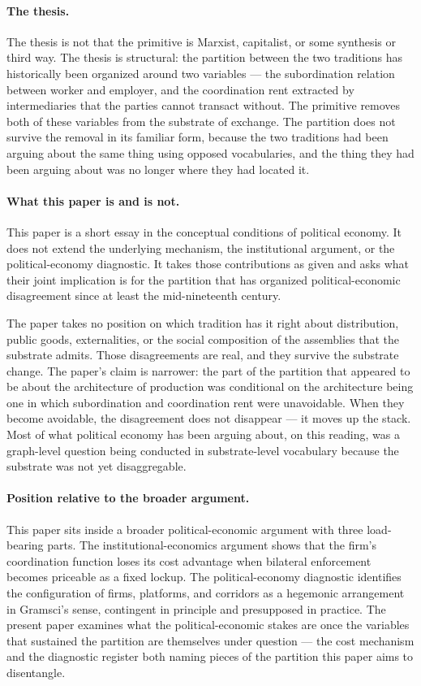 \documentclass[11pt,a4paper]{article}
\theoremstyle{remark}
\begin{document}
\paragraph{The thesis.}
The thesis is not that the primitive is Marxist, capitalist, or
some synthesis or third way. The thesis is structural: the
partition between the two traditions has historically been
organized around two variables --- the subordination relation
between worker and employer, and the coordination rent extracted by
intermediaries that the parties cannot transact without. The
primitive removes both of these variables from the substrate of
exchange. The partition does not survive the removal in its
familiar form, because the two traditions had been arguing about
the same thing using opposed vocabularies, and the thing they had
been arguing about was no longer where they had located it.

\paragraph{What this paper is and is not.}
This paper is a short essay in the conceptual conditions of
political economy. It does not extend the underlying mechanism,
the institutional argument, or the political-economy diagnostic.
It takes those contributions as given and asks what their joint
implication is for the partition that has organized
political-economic disagreement since at least the
mid-nineteenth century.

The paper takes no position on which tradition has it right about
distribution, public goods, externalities, or the social
composition of the assemblies that the substrate admits. Those
disagreements are real, and they survive the substrate change.
The paper's claim is narrower: the part of the partition that
appeared to be about the architecture of production was
conditional on the architecture being one in which subordination
and coordination rent were unavoidable. When they become
avoidable, the disagreement does not disappear --- it moves up the
stack. Most of what political economy has been arguing about, on
this reading, was a graph-level question being conducted in
substrate-level vocabulary because the substrate was not yet
disaggregable.

\paragraph{Position relative to the broader argument.}
This paper sits inside a broader political-economic argument
with three load-bearing parts. The institutional-economics
argument shows that the firm's coordination function loses its
cost advantage when bilateral enforcement becomes priceable as a
fixed lockup. The political-economy diagnostic identifies the
configuration of firms, platforms, and corridors as a hegemonic
arrangement in Gramsci's sense, contingent in principle and
presupposed in practice. The present paper examines what the
political-economic stakes are once the variables that sustained
the partition are themselves under question --- the cost
mechanism and the diagnostic register both naming pieces of the
partition this paper aims to disentangle.
\end{document}
